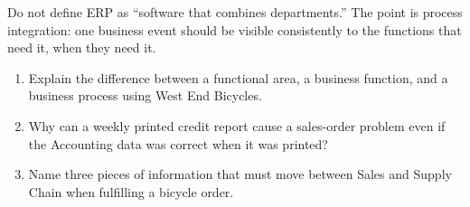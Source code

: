 \begin{pitfall}
Do not define ERP as ``software that combines departments.'' The point is
process integration: one business event should be visible consistently to the
functions that need it, when they need it.
\end{pitfall}

\begin{quickcheck}
\begin{enumerate}
  \item Explain the difference between a functional area, a business function, and a business process using West End Bicycles.
  \item Why can a weekly printed credit report cause a sales-order problem even if the Accounting data was correct when it was printed?
  \item Name three pieces of information that must move between Sales and Supply Chain when fulfilling a bicycle order.
\end{enumerate}
\end{quickcheck}
